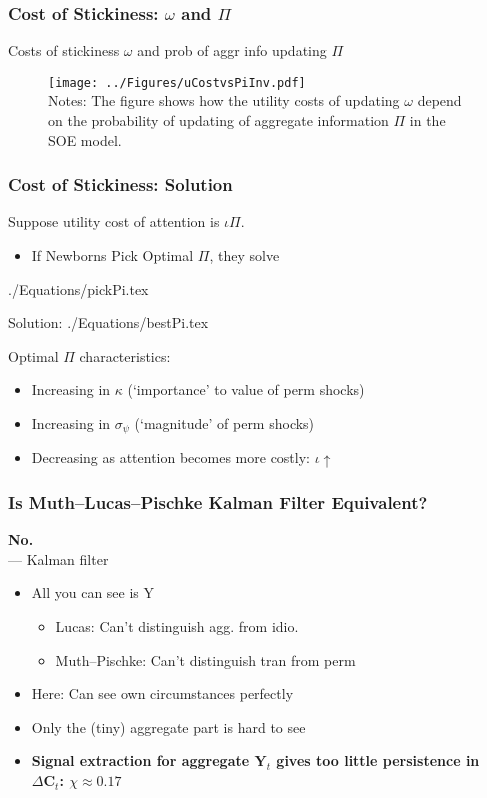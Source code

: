 \documentclass{beamer}\usepackage{dcolumn}
\newcommand{\jbemph}[1]{\textbf{\color{SlideNavy}#1}}
\providecommand{\econtexRoot}{.}
\providecommand{\eq}{\econtexRoot/Equations}
\begin{document}
\begin{frame}
\frametitle{Cost of Stickiness: $\omega$ and $\Pi$}

Costs of stickiness $\omega$ and prob of aggr info updating $\Pi$

\begin{figure}
\label{costOfStickiness}
\texttt{[image: ../Figures/uCostvsPiInv.pdf]}\\
\tiny Notes: The figure shows how the utility costs of updating $\omega$ depend on the probability of updating of aggregate information $\Pi$ in the SOE model.
\end{figure}

\end{frame}




\begin{frame}
\frametitle{Cost of Stickiness: Solution}
Suppose utility cost of attention is $\iota\Pi$.
\begin{itemize}
\item If Newborns Pick Optimal $\Pi$, they solve
\end{itemize}

 \eq/pickPi.tex

Solution:
 \eq/bestPi.tex

Optimal $\Pi$ characteristics:
\begin{itemize}
\item Increasing in $\kappa$ (`importance' to value of perm shocks)
\item Increasing in $\sigma_{\psi}$ (`magnitude' of perm shocks)
\item Decreasing as attention becomes more costly: $\iota \uparrow$
\end{itemize}


\end{frame}


\begin{frame}
\frametitle{Is Muth--Lucas--Pischke Kalman Filter Equivalent?}

\jbemph{No.}\\
\cite{muthOptimal}--\cite{lucas:imperfectInfo}--\cite{pischkeMicroMacro} Kalman filter
\begin{itemize}
\item  All you can see is Y
\begin{itemize}
\item Lucas: Can't distinguish agg. from idio.
\item Muth--Pischke: Can't distinguish tran from perm
\end{itemize}

\item Here: Can see own circumstances perfectly

\item Only the (tiny) aggregate part is hard to see

\item \jbemph{Signal extraction for aggregate $\mathbf{Y}_t$ gives too little persistence in $\Delta \mathbf{C}_t$: $\chi\approx 0.17$}


\end{itemize}

\end{frame}
\end{document}
